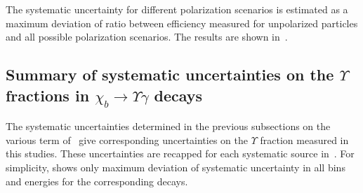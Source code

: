The systematic uncertainty for different polarization scenarios is estimated
as a maximum deviation of ratio between efficiency measured for unpolarized
particles and all possible polarization scenarios. The results  are
shown in~.



\subsection{Summary of systematic uncertainties on the $\Upsilon$ fractions in
$\chi_b \to \Upsilon \gamma$ decays} The systematic uncertainties determined in
the previous subsections on the various term of~ give
corresponding uncertainties on the $\Upsilon$ fraction measured in this
studies. These uncertainties are recapped for each systematic source
in~. For simplicity,
 shows only maximum deviation of systematic uncertainty
in all bins and energies for the corresponding decays.



% 


